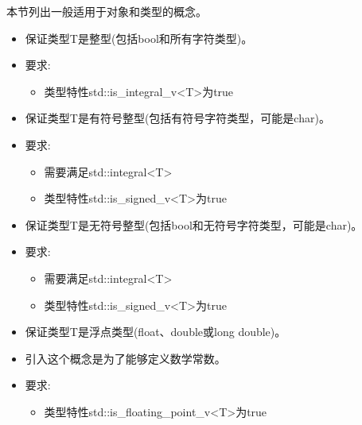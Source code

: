 

本节列出一般适用于对象和类型的概念。



\begin{itemize}
\item
保证类型T是整型(包括bool和所有字符类型)。

\item
要求:
\begin{itemize}
\item
类型特性std::is\_integral\_v<T>为true
\end{itemize}
\end{itemize}



\begin{itemize}
\item
保证类型T是有符号整型(包括有符号字符类型，可能是char)。

\item
要求:
\begin{itemize}
\item
需要满足std::integral<T>

\item
类型特性std::is\_signed\_v<T>为true
\end{itemize}
\end{itemize}


\begin{itemize}
\item
保证类型T是无符号整型(包括bool和无符号字符类型，可能是char)。

\item
要求:
\begin{itemize}
\item
需要满足std::integral<T>

\item
类型特性std::is\_signed\_v<T>为true
\end{itemize}
\end{itemize}


\begin{itemize}
\item
保证类型T是浮点类型(float、double或long double)。

\item
引入这个概念是为了能够定义数学常数。

\item
要求:
\begin{itemize}
\item
类型特性std::is\_floating\_point\_v<T>为true
\end{itemize}
\end{itemize}


